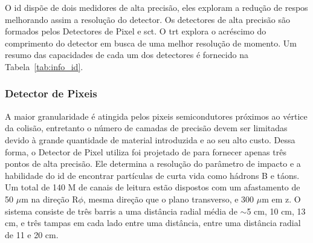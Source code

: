 O \gls{id} dispõe de dois medidores de alta precisão, eles exploram a redução 
de \gls{respos} melhorando assim a resolução do detector. Os detectores de alta 
precisão são formados pelos Detectores de Pixel e \gls{sct}. O \gls{trt}
explora o acréscimo do \gls{comprimento} do detector em busca de uma melhor
resolução de momento. Um resumo das capacidades de
cada um dos detectores é fornecido na Tabela~\ref{tab:info_id}.

\begin{table}
\centering
{}
\caption[Parâmetros do ID]
{Parâmetros do ID. As resoluções estão citadas em valores típicos (a
resolução verdadeira em cada detector depende do ângulo de impacto). Adaptado de
\cite{ATLAS_TDR}. O número de tampas de pixeis foi corrigida com base em
\cite{pixel,inner_tdr1}.}
\label{tab:info_id}
\end{table}

\subsubsection{Detector de Pixeis}
\label{sssec:pixeis}

A maior granularidade é atingida pelos pixeis semicondutores próximos
ao vértice da colisão, entretanto o número de camadas de precisão devem ser
limitadas devido à grande quantidade de material introduzida e ao seu alto
custo. Dessa forma, o Detector de Pixel utiliza foi projetado de para
fornecer apenas três pontos de alta precisão. Ele determina a resolução do
parâmetro de impacto e a habilidade do \gls{id} de encontrar partículas de curta
vida como hádrons B e táons. Um total de 140 M de canais de
leitura estão dispostos com um afastamento de 50 $\mu$m na direção R$\phi$, 
mesma direção que o plano transverso, e 300 $\mu$m em z. 
O sistema consiste de três barris a uma distância radial
média de $\sim$5 cm, 10 cm, 13 cm, e três tampas em cada lado entre uma
distância, entre uma distância radial de 11 e 20 cm.

